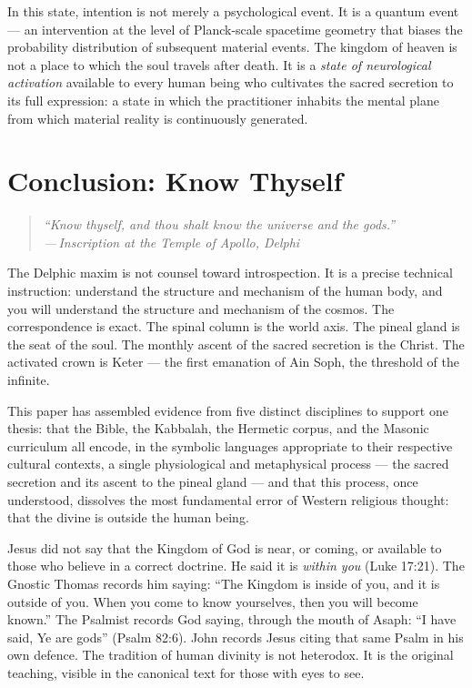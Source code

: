 \documentclass[12pt, a4paper]{article}
\newcommand{\epigraph}[2]{%
  \begin{quote}
    \itshape ``#1''\\[0.3em]
    \normalfont\small\hfill ---\,#2
  \end{quote}
}
\begin{document}
In this state, intention is not merely a psychological event. It is a quantum
event — an intervention at the level of Planck-scale spacetime geometry that
biases the probability distribution of subsequent material events. The kingdom
of heaven is not a place to which the soul travels after death. It is a
\emph{state of neurological activation} available to every human being who
cultivates the sacred secretion to its full expression: a state in which the
practitioner inhabits the mental plane from which material reality is
continuously generated.

\section{Conclusion: Know Thyself}
\label{sec:conclusion}

\epigraph{Know thyself, and thou shalt know the universe and the gods.}{Inscription
at the Temple of Apollo, Delphi}

The Delphic maxim is not counsel toward introspection. It is a precise
technical instruction: understand the structure and mechanism of the human
body, and you will understand the structure and mechanism of the cosmos. The
correspondence is exact. The spinal column is the world axis. The pineal gland
is the seat of the soul. The monthly ascent of the sacred secretion is the
Christ. The activated crown is Keter — the first emanation of Ain Soph, the
threshold of the infinite.

This paper has assembled evidence from five distinct disciplines to support
one thesis: that the Bible, the Kabbalah, the Hermetic corpus, and the
Masonic curriculum all encode, in the symbolic languages appropriate to their
respective cultural contexts, a single physiological and metaphysical process
— the sacred secretion and its ascent to the pineal gland — and that this
process, once understood, dissolves the most fundamental error of Western
religious thought: that the divine is outside the human being.

Jesus did not say that the Kingdom of God is near, or coming, or available to
those who believe in a correct doctrine. He said it is \emph{within you}
(Luke 17:21). The Gnostic Thomas records him saying: ``The Kingdom is inside
of you, and it is outside of you. When you come to know yourselves, then you
will become known.'' The Psalmist records God saying, through the mouth of
Asaph: ``I have said, Ye are gods'' (Psalm 82:6). John records Jesus citing
that same Psalm in his own defence. The tradition of human divinity is not
heterodox. It is the original teaching, visible in the canonical text for
those with eyes to see.
\end{document}
